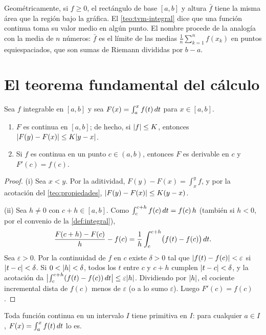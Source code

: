 Geométricamente, si $f\ge0$, el rectángulo de base $[a,b]$ y altura $\bar f$ tiene la misma área que la región bajo la gráfica. El \cref{teo:tvm-integral} dice que una función continua toma su valor medio en algún punto. El nombre procede de la analogía con la media de $n$ números: $\bar f$ es el límite de las medias $\frac1n\sum_{k=1}^{n}f(x_k)$ en puntos equiespaciados, que son sumas de Riemann divididas por $b-a$.

\section{El teorema fundamental del cálculo}

\begin{teorema}\label{teo:tfc1}
Sea $f$ integrable en $[a,b]$ y sea $F(x)=\int_a^x f(t)\mathop{}\!d t$ para $x\in[a,b]$.
\begin{enumerate}
  \item $F$ es continua en $[a,b]$; de hecho, si $\lvert f\rvert\le K$, entonces $\lvert F(y)-F(x)\rvert\le K\lvert y-x\rvert$.
  \item Si $f$ es continua en un punto $c\in(a,b)$, entonces $F$ es derivable en $c$ y $F'(c)=f(c)$.
\end{enumerate}
\end{teorema}

\begin{proof}
(i) Sea $x<y$. Por la aditividad, $F(y)-F(x)=\int_x^y f$, y por la acotación del \cref{teo:propiedades}, $\lvert F(y)-F(x)\rvert\le K(y-x)$.

(ii) Sea $h\neq0$ con $c+h\in[a,b]$. Como $\int_c^{c+h}f(c)\mathop{}\!d t=f(c)\,h$ (también si $h<0$, por el convenio de la \cref{def:integral}),
\[
\frac{F(c+h)-F(c)}{h}-f(c)=\frac1h\int_c^{c+h}\bigl(f(t)-f(c)\bigr)\mathop{}\!d t .
\]
Sea $\varepsilon>0$. Por la continuidad de $f$ en $c$ existe $\delta>0$ tal que $\lvert f(t)-f(c)\rvert<\varepsilon$ si $\lvert t-c\rvert<\delta$. Si $0<\lvert h\rvert<\delta$, todos los $t$ entre $c$ y $c+h$ cumplen $\lvert t-c\rvert<\delta$, y la acotación da $\bigl|\int_c^{c+h}(f(t)-f(c))\mathop{}\!d t\bigr|\le\varepsilon\lvert h\rvert$. Dividiendo por $\lvert h\rvert$, el cociente incremental dista de $f(c)$ menos de $\varepsilon$ (o a lo sumo $\varepsilon$). Luego $F'(c)=f(c)$.
\end{proof}

\begin{corolario}\label{cor:existencia-primitiva}
Toda función continua en un intervalo $I$ tiene primitiva en $I$: para cualquier $a\in I$, $F(x)=\int_a^x f(t)\mathop{}\!d t$ lo es.
\end{corolario}

